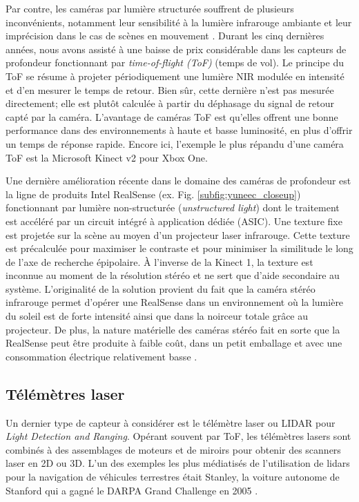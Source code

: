 Par contre, les caméras par lumière structurée souffrent de plusieurs inconvénients, notamment leur sensibilité à la lumière infrarouge ambiante et leur imprécision dans le cas de scènes en mouvement \citep{khoshelham2012}. Durant les cinq dernières années, nous avons assisté à une baisse de prix considérable dans les capteurs de profondeur fonctionnant par \textit{time-of-flight (ToF)} (temps de vol). Le principe du ToF se résume à projeter périodiquement une lumière NIR modulée en intensité et d'en mesurer le temps de retour. Bien sûr, cette dernière n'est pas mesurée directement; elle est plutôt calculée à partir du déphasage du signal de retour capté par la caméra. L'avantage de caméras ToF est qu'elles offrent une bonne performance dans des environnements à haute et basse luminosité, en plus d'offrir un temps de réponse rapide. Encore ici, l'exemple le plus répandu d'une caméra ToF est la Microsoft Kinect v2 pour Xbox One.

Une dernière amélioration récente dans le domaine des caméras de profondeur est la ligne de produits Intel RealSense (ex. Fig. \ref{subfig:yuneec_closeup}) fonctionnant par lumière non-structurée (\emph{unstructured light}) dont le traitement est accéléré par un circuit intégré à application dédiée (ASIC). Une texture fixe est projetée sur la scène au moyen d'un projecteur laser infrarouge. Cette texture est précalculée pour maximiser le contraste et pour minimiser la similitude le long de l'axe de recherche épipolaire. À l'inverse de la Kinect 1, la texture est inconnue au moment de la résolution stéréo et ne sert que d'aide secondaire au système. L'originalité de la solution provient du fait que la caméra stéréo infrarouge permet d'opérer une RealSense dans un environnement où la lumière du soleil est de forte intensité ainsi que dans la noirceur totale grâce au projecteur. De plus, la nature matérielle des caméras stéréo fait en sorte que la RealSense peut être produite à faible coût, dans un petit emballage et avec une consommation électrique relativement basse \citep{Keselman_2017_CVPR_Workshops}.

\subsection{Télémètres laser}

Un dernier type de capteur à considérer est le télémètre laser ou LIDAR pour \textit{Light Detection and Ranging}. Opérant souvent par ToF, les télémètres lasers sont combinés à des assemblages de moteurs et de miroirs pour obtenir des scanners laser en 2D ou 3D. L'un des exemples les plus médiatisés de l'utilisation de lidars pour la navigation de véhicules terrestres était Stanley, la voiture autonome de Stanford qui a gagné le DARPA Grand Challenge en 2005 \citep{thrun2006stanley}.

